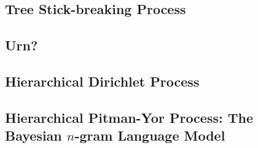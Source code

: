 \subsection{Tree Stick-breaking Process}

\subsection{Urn?}

\subsection{Hierarchical Dirichlet Process}

\subsection{Hierarchical Pitman-Yor Process: The Bayesian $n$-gram Language Model}




